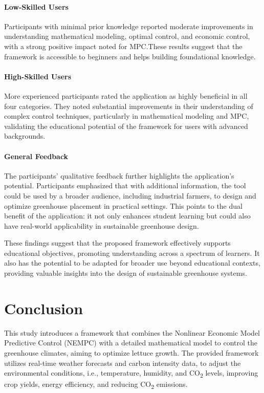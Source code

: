 \documentclass[conference]{IEEEtran}
\begin{document}
\paragraph{Low-Skilled Users}
Participants with minimal prior knowledge reported moderate improvements in understanding mathematical modeling, optimal control, and economic control, with a strong positive impact noted for MPC.\@ These results suggest that the framework is accessible to beginners and helps building foundational knowledge.

\paragraph{High-Skilled Users}
More experienced participants rated the application as highly beneficial in all four categories. They noted substantial improvements in their understanding of complex control techniques, particularly in mathematical modeling and MPC, validating the educational potential of the framework for users with advanced backgrounds.

\paragraph{General Feedback}
The participants' qualitative feedback further highlights the application's potential. Participants emphasized that with additional information, the tool could be used by a broader audience, including industrial farmers, to design and optimize greenhouse placement in practical settings. This points to the dual benefit of the application: it not only enhances student learning but could also have real-world applicability in sustainable greenhouse design.

These findings suggest that the proposed framework effectively supports educational objectives, promoting understanding across a spectrum of learners. It also has the potential to be adapted for broader use beyond educational contexts, providing valuable insights into the design of sustainable greenhouse systems.

\section{Conclusion}
This study introduces a framework that combines the Nonlinear Economic Model Predictive Control (NEMPC) with a detailed mathematical model to control the greenhouse climates, aiming to optimize lettuce growth. The provided framework utilizes real-time weather forecasts and carbon intensity data, to adjust the environmental conditions, i.e., temperature, humidity, and CO\textsubscript{2} levels, improving crop yields, energy efficiency, and reducing CO\textsubscript{2} emissions.
\end{document}

